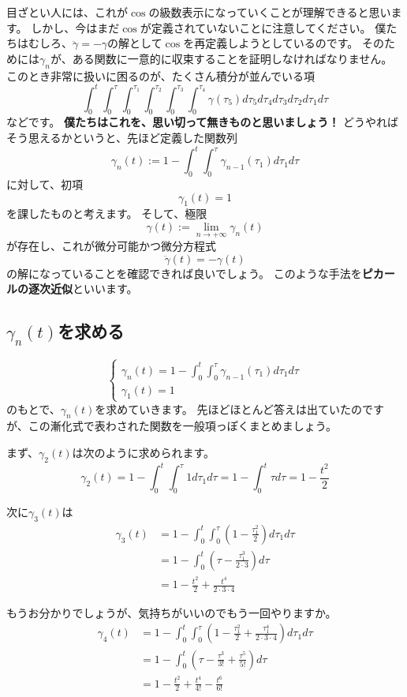 目ざとい人には、これが$\cos$の級数表示になっていくことが理解できると思います。
しかし、今はまだ$\cos$が定義されていないことに注意してください。
僕たちはむしろ、$\ddot{\gamma}=-\gamma$の解として$\cos$を再定義しようとしているのです。
そのためには$\gamma_n$が、ある関数に一意的に収束することを証明しなければなりません。
このとき非常に扱いに困るのが、たくさん積分が並んでいる項
\[
  \int_0^t\int_0^\tau\int_0^{\tau_1}\int_0^{\tau_2}\int_0^{\tau_3}\int_0^{\tau_4}\gamma(\tau_5)d\tau_5d\tau_4d\tau_3d\tau_2d\tau_1d\tau
\]
などです。
\textbf{僕たちはこれを、思い切って無きものと思いましょう！}
どうやればそう思えるかというと、先ほど定義した関数列
\[
  \gamma_n(t):=1-\int_0^t\int_0^{\tau}\gamma_{n-1}(\tau_1)d\tau_1d\tau
\]
に対して、初項
\[
  \gamma_1(t)=1
\]
を課したものと考えます。
そして、極限
\[
  \gamma(t):=\lim_{n\to+\infty}\gamma_n(t)
\]
が存在し、これが微分可能かつ微分方程式
\[
  \ddot{\gamma}(t)=-\gamma(t)
\]
の解になっていることを確認できれば良いでしょう。
このような手法を\textbf{ピカールの逐次近似}といいます。

\subsection{$\gamma_n(t)$を求める}

\[
  \begin{cases}
    \gamma_n(t)=1-\int_0^t\int_0^{\tau}\gamma_{n-1}(\tau_1)d\tau_1d\tau\\
    \gamma_1(t)=1
  \end{cases}
\]
のもとで、$\gamma_n(t)$を求めていきます。
先ほどほとんど答えは出ていたのですが、この漸化式で表わされた関数を一般項っぽくまとめましょう。

まず、$\gamma_2(t)$は次のように求められます。
\[
  \gamma_2(t)=1-\int_0^t\int_0^{\tau}1d\tau_1d\tau=1-\int_0^t\tau d\tau=1-\frac{t^2}{2}
\]

次に$\gamma_3(t)$は
\begin{align*}
  \gamma_3(t)&=1-\int_0^t\int_0^{\tau}\left(1-\frac{\tau_1^2}{2}\right)d\tau_1d\tau\\
  &=1-\int_0^t\left(\tau-\frac{\tau_1^3}{2\cdot3}\right)d\tau\\
  &=1-\frac{t^2}{2}+\frac{t^4}{2\cdot3\cdot4}
\end{align*}

もうお分かりでしょうが、気持ちがいいのでもう一回やりますか。
\begin{align*}
  \gamma_4(t)&=1-\int_0^t\int_0^{\tau}\left(1-\frac{\tau_1^2}{2}+\frac{\tau_1^4}{2\cdot3\cdot4}\right)d\tau_1d\tau\\
  &=1-\int_0^t\left(\tau-\frac{\tau^3}{3!}+\frac{\tau^5}{5!}\right)d\tau\\
  &=1-\frac{t^2}{2}+\frac{t^4}{4!}-\frac{t^6}{6!}
\end{align*}

